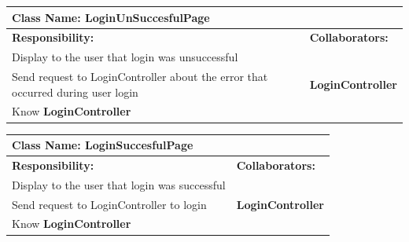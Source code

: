 \documentclass[]{article}
\begin{document}
    \begin{table}[H]
        \centering
        \begin{tabular}{|p{5cm}|p{5cm}|}
        \hline 
         \multicolumn{2}{|l|}{\textbf{Class Name:} LoginUnSuccesfulPage} \\
        \hline
        \textbf{Responsibility:} & \textbf{Collaborators:} \\
        \hline
        Display to the user that login was unsuccessful &  \phantom{} \\
        \hline
        Send request to LoginController about the error that occurred during user  login &  \textbf{LoginController}
      \phantom{} \\
        \hline
        Know \textbf{LoginController} & \phantom{} \\
        \hline
        
        \end{tabular}
    \end{table}

    \begin{table}[H]
        \centering
        \begin{tabular}{|p{5cm}|p{5cm}|}
        \hline 
         \multicolumn{2}{|l|}{\textbf{Class Name:} LoginSuccesfulPage} \\
        \hline
        \textbf{Responsibility:} & \textbf{Collaborators:} \\
        \hline
        Display to the user that login was successful &  \phantom{} \\
        \hline
        Send request to LoginController to login &  \textbf{LoginController}
      \phantom{} \\
        \hline
        Know \textbf{LoginController} & \phantom{} \\
        \hline
        
        \end{tabular}
    \end{table}
\end{document}
